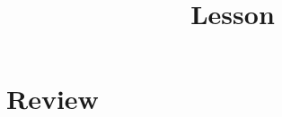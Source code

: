 \documentclass[CJK]{beamer}
\title{Lesson }
\author{}
\date{}
\begin{document}
\tpage{}{}

\section{Review}

\begin{frame}
\bch 
\bitem
\item{}
\eitem
\ech
\end{frame}

\begin{frame}
\bch
\bitem
\item{}
\eitem
\ech
\end{frame}


\section{}

\begin{frame}
\chtitle{}
\bch
\ech
\end{frame}

\begin{frame}
\chtitle{}
\bch
\ech
\end{frame}

\begin{frame}
\chtitle{}
\bch
\ech
\end{frame}

\begin{frame}
\chtitle{}
\bch
\ech
\end{frame}

\begin{frame}
\chtitle{}
\bch
\ech
\end{frame}

\begin{frame}
\chtitle{}
\bch
\ech
\end{frame}
\end{document}
